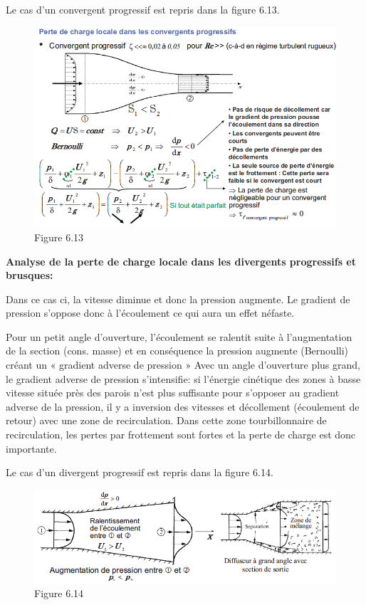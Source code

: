 Le cas d'un convergent progressif est repris dans la figure 6.13. 

\begin{figure}[h]
\begin{center}
\includegraphics[scale=0.40]{ch6/74.png}
\caption*{Figure 6.13}
\end{center}
\end{figure}

\textbf{Analyse de la perte de charge locale dans les divergents progressifs et brusques:}

Dans ce cas ci, la vitesse diminue et donc la pression augmente. Le gradient de pression s'oppose donc à l'écoulement ce qui aura un effet néfaste.

Pour un petit angle d’ouverture, l’écoulement se ralentit suite à l’augmentation de la section (cons. masse)
et en conséquence la pression augmente (Bernoulli) créant un « gradient adverse de pression » Avec un angle d’ouverture plus grand, le gradient adverse de pression s’intensifie: si l’énergie cinétique des zones à basse vitesse située près des parois n’est plus suffisante pour s’opposer au gradient adverse de la pression, il y a inversion des vitesses et décollement (écoulement de retour) avec une zone de recirculation. Dans cette zone tourbillonnaire de recirculation, les pertes par frottement sont fortes et la perte de charge est donc importante.

Le cas d'un divergent progressif est repris dans la figure 6.14. 

\begin{figure}[H]
\begin{center}
\includegraphics[scale=0.40]{ch6/75.png}
\caption*{Figure 6.14}
\end{center}
\end{figure}


